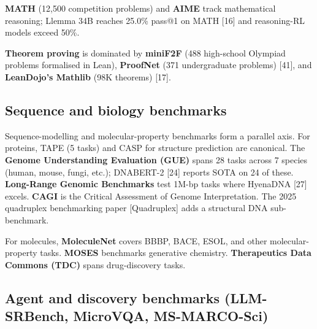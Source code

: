 \textbf{MATH} (12,500 competition problems) and \textbf{AIME} track mathematical reasoning; Llemma 34B reaches 25.0\% pass@1 on MATH {[}16{]} and reasoning-RL models exceed 50\%.

\textbf{Theorem proving} is dominated by \textbf{miniF2F} (488 high-school Olympiad problems formalised in Lean), \textbf{ProofNet} (371 undergraduate problems) {[}41{]}, and \textbf{LeanDojo's Mathlib} (98K theorems) {[}17{]}.

\subsection{Sequence and biology benchmarks}\label{sequence-and-biology-benchmarks}

Sequence-modelling and molecular-property benchmarks form a parallel axis. For proteins, TAPE (5 tasks) and CASP for structure prediction are canonical. The \textbf{Genome Understanding Evaluation (GUE)} spans 28 tasks across 7 species (human, mouse, fungi, etc.); DNABERT-2 {[}24{]} reports SOTA on 24 of these. \textbf{Long-Range Genomic Benchmarks} test 1M-bp tasks where HyenaDNA {[}27{]} excels. \textbf{CAGI} is the Critical Assessment of Genome Interpretation. The 2025 quadruplex benchmarking paper {[}Quadruplex{]} adds a structural DNA sub-benchmark.

For molecules, \textbf{MoleculeNet} covers BBBP, BACE, ESOL, and other molecular-property tasks. \textbf{MOSES} benchmarks generative chemistry. \textbf{Therapeutics Data Commons (TDC)} spans drug-discovery tasks.

\subsection{Agent and discovery benchmarks (LLM-SRBench, MicroVQA, MS-MARCO-Sci)}\label{agent-and-discovery-benchmarks-llm-srbench-microvqa-ms-marco-sci}

